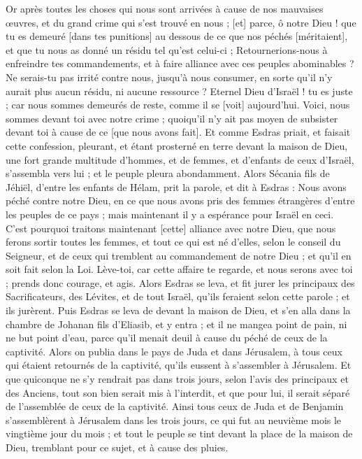 \begin{multicols}{2}
Or après toutes les choses qui nous sont arrivées à cause de nos mauvaises œuvres, et du grand crime qui s'est trouvé en nous ; [et] parce, ô notre Dieu ! que tu es demeuré [dans tes punitions] au dessous de ce que nos péchés [méritaient], et que tu nous as donné un résidu tel qu'est celui-ci ;
Retournerions-nous à enfreindre tes commandements, et à faire alliance avec ces peuples abominables ? Ne serais-tu pas irrité contre nous, jusqu'à nous consumer, en sorte qu'il n'y aurait plus aucun résidu, ni aucune ressource ?
Eternel Dieu d'Israël ! tu es juste ; car nous sommes demeurés de reste, comme il se [voit] aujourd'hui. Voici, nous sommes devant toi avec notre crime ; quoiqu'il n'y ait pas moyen de subsister devant toi à cause de ce [que nous avons fait].
\VerseOne{}Et comme Esdras priait, et faisait cette confession, pleurant, et étant prosterné en terre devant la maison de Dieu, une fort grande multitude d'hommes, et de femmes, et d'enfants de ceux d'Israël, s'assembla vers lui ; et le peuple pleura abondamment.
Alors Sécania fils de Jéhiël, d'entre les enfants de Hélam, prit la parole, et dit à Esdras : Nous avons péché contre notre Dieu, en ce que nous avons pris des femmes étrangères d'entre les peuples de ce pays ; mais maintenant il y a espérance pour Israël en ceci.
C'est pourquoi traitons maintenant [cette] alliance avec notre Dieu, que nous ferons sortir toutes les femmes, et tout ce qui est né d'elles, selon le conseil du Seigneur, et de ceux qui tremblent au commandement de notre Dieu ; et qu'il en soit fait selon la Loi.
Lève-toi, car cette affaire te regarde, et nous serons avec toi ; prends donc courage, et agis.
Alors Esdras se leva, et fit jurer les principaux des Sacrificateurs, des Lévites, et de tout Israël, qu'ils feraient selon cette parole ; et ils jurèrent.
Puis Esdras se leva de devant la maison de Dieu, et s'en alla dans la chambre de Johanan fils d'Eliasib, et y entra ; et il ne mangea point de pain, ni ne but point d'eau, parce qu'il menait deuil à cause du péché de ceux de la captivité.
Alors on publia dans le pays de Juda et dans Jérusalem, à tous ceux qui étaient retournés de la captivité, qu'ils eussent à s'assembler à Jérusalem.
Et que quiconque ne s'y rendrait pas dans trois jours, selon l'avis des principaux et des Anciens, tout son bien serait mis à l'interdit, et que pour lui, il serait séparé de l'assemblée de ceux de la captivité.
Ainsi tous ceux de Juda et de Benjamin s'assemblèrent à Jérusalem dans les trois jours, ce qui fut au neuvième mois le vingtième jour du mois ; et tout le peuple se tint devant la place de la maison de Dieu, tremblant pour ce sujet, et à cause des pluies.

\end{multicols}
